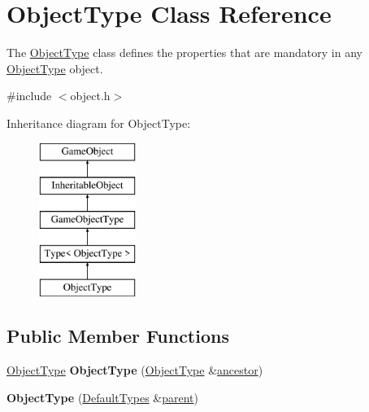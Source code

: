 \hypertarget{class_object_type}{\section{\-Object\-Type \-Class \-Reference}
\label{class_object_type}
}


\-The \hyperlink{class_object_type}{\-Object\-Type} class defines the properties that are mandatory in any \hyperlink{class_object_type}{\-Object\-Type} object.  




{\ttfamily \#include $<$object.\-h$>$}

\-Inheritance diagram for \-Object\-Type\-:\begin{figure}[H]
\begin{center}
\leavevmode
\includegraphics[height=5.000000cm]{class_object_type}
\end{center}
\end{figure}
\subsection*{\-Public \-Member \-Functions}
\begin{DoxyCompactItemize}
\item 
\hypertarget{class_object_type_a331d8b3f8f0cefa4c1806d5005ab39fb}{\hyperlink{class_object_type}{\-Object\-Type} {\bfseries \-Object\-Type} (\hyperlink{class_object_type}{\-Object\-Type} \&\hyperlink{class_inheritable_object_ac87a3c55ca4be252c527a29fe162bb15}{ancestor})}\label{class_object_type_a331d8b3f8f0cefa4c1806d5005ab39fb}

\item 
\hypertarget{class_object_type_ab0c8f836fb9a204d6a8c5fc430988135}{{\bfseries \-Object\-Type} (\hyperlink{class_default_types}{\-Default\-Types} \&\hyperlink{class_game_object_af3deaf39cde23c189765634e32e95bb4}{parent})}\label{class_object_type_ab0c8f836fb9a204d6a8c5fc430988135}

\end{DoxyCompactItemize}



